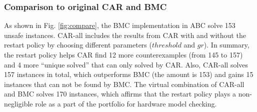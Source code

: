\subsubsection{Comparison to original CAR and BMC }
As shown in Fig. \ref{fig:compare}, the BMC implementation in ABC solve 153 unsafe instances. CAR-all includes the results from CAR with and without the restart policy by choosing different parameters ($threshold$ and $gr$). In summary, the restart policy helps CAR find 12 more counterexamples (from 145 to 157) and 4 more ``unique solved'' that can only solved by CAR. Also, CAR-all solves 157 instances in total, which outperforms BMC (the amount is 153) and gains 15 instances that can not be found by BMC. The virtual combination of CAR-all and BMC  solves 170 instances, which affirms that the restart policy plays a non-negligible role as a part of the portfolio for hardware model checking.
